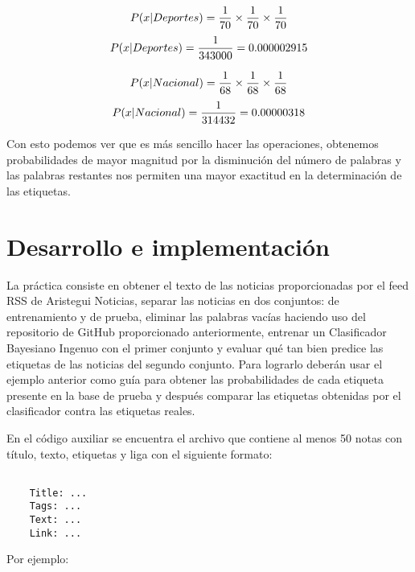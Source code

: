 \[ P(x | Deportes) = {1 \over 70} \times {1 \over 70} \times {1 \over 70} \]
\[ P(x | Deportes) = { 1 \over 343000 } = 0.000002915 \]

\[ P(x | Nacional) = {1 \over 68} \times {1 \over 68} \times {1 \over 68} \]
\[ P(x | Nacional) = { 1 \over 314432 } = 0.00000318 \]

Con esto podemos ver que es más sencillo hacer las operaciones, obtenemos probabilidades de mayor magnitud por la disminución del número de palabras y las palabras restantes nos permiten una mayor exactitud en la determinación de las etiquetas.

\section{Desarrollo e implementaci\'on}

La práctica consiste en obtener el texto de las noticias proporcionadas por el feed RSS de Aristegui Noticias, separar las noticias en dos conjuntos: de entrenamiento y de prueba, eliminar las palabras vacías haciendo uso del repositorio de GitHub proporcionado anteriormente, entrenar un Clasificador Bayesiano Ingenuo con el primer conjunto y evaluar qué tan bien predice las etiquetas de las noticias del segundo conjunto. Para lograrlo deberán usar el ejemplo anterior como guía para obtener las probabilidades de cada etiqueta presente en la base de prueba y después comparar las etiquetas obtenidas por el clasificador contra las etiquetas reales.

En el código auxiliar se encuentra el archivo  que contiene al menos 50 notas con título, texto, etiquetas y liga con el siguiente formato:

\begin{verbatim}

    Title: ...
    Tags: ...
    Text: ...
    Link: ...

\end{verbatim}

Por ejemplo:

